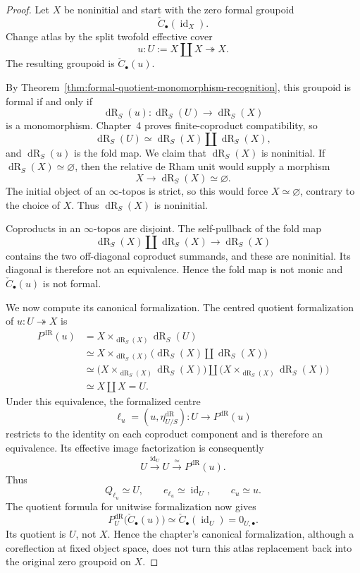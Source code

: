 \begin{proof}
Let $X$ be noninitial and start with the zero formal groupoid
\[
    \check C_\bullet(\operatorname{id}_X).
\]
Change atlas by the split twofold effective cover
\[
    u:
    U:=X\amalg X
    \twoheadrightarrow
    X.
\]
The resulting groupoid is $\check C_\bullet(u)$.

By Theorem~\ref{thm:formal-quotient-monomorphism-recognition}, this groupoid is
formal if and only if
\[
    \operatorname{dR}_S(u):
    \operatorname{dR}_S(U)\longrightarrow \operatorname{dR}_S(X)
\]
is a monomorphism.  Chapter~4 proves finite-coproduct
compatibility, so
\[
    \operatorname{dR}_S(U)
    \simeq
    \operatorname{dR}_S(X)\amalg \operatorname{dR}_S(X),
\]
and $\operatorname{dR}_S(u)$ is the fold map.  We claim that $\operatorname{dR}_S(X)$ is noninitial.  If
$\operatorname{dR}_S(X)\simeq\varnothing$, then the relative de Rham unit would supply a
morphism
\[
    X\longrightarrow \operatorname{dR}_S(X)\simeq\varnothing.
\]
The initial object of an $\infty$-topos is strict, so this would force
$X\simeq\varnothing$, contrary to the choice of $X$.  Thus $\operatorname{dR}_S(X)$ is
noninitial.

Coproducts in an $\infty$-topos are disjoint.  The self-pullback of the fold
map
\[
    \operatorname{dR}_S(X)\amalg \operatorname{dR}_S(X)
    \longrightarrow
    \operatorname{dR}_S(X)
\]
contains the two off-diagonal coproduct summands, and these are noninitial.
Its diagonal is therefore not an equivalence.  Hence the fold map is not
monic and $\check C_\bullet(u)$ is not formal.

We now compute its canonical formalization.  The centred quotient formalization
of $u:U\twoheadrightarrow X$ is
\[
\begin{aligned}
    P^{\mathrm{dR}}(u)
    &=
    X\times_{\operatorname{dR}_S(X)}\operatorname{dR}_S(U)\\
    &\simeq
    X\times_{\operatorname{dR}_S(X)}
    \bigl(\operatorname{dR}_S(X)\amalg \operatorname{dR}_S(X)\bigr)\\
    &\simeq
    \bigl(X\times_{\operatorname{dR}_S(X)}\operatorname{dR}_S(X)\bigr)
    \amalg
    \bigl(X\times_{\operatorname{dR}_S(X)}\operatorname{dR}_S(X)\bigr)\\
    &\simeq
    X\amalg X
    =
    U.
\end{aligned}
\]
Under this equivalence, the formalized centre
\[
    \ell_u=(u,\eta_{U/S}^{\mathrm{dR}}):U\longrightarrow P^{\mathrm{dR}}(u)
\]
restricts to the identity on each coproduct component and is therefore an
equivalence.  Its effective image factorization is consequently
\[
    U
    \xrightarrow{\operatorname{id}_U}
    U
    \xrightarrow{\simeq}
    P^{\mathrm{dR}}(u).
\]
Thus
\[
    Q_{\ell_u}\simeq U,
    \qquad
    e_{\ell_u}\simeq\operatorname{id}_U,
    \qquad
    c_u\simeq u.
\]
The quotient formula for unitwise formalization now gives
\[
    P_U^{\mathrm{dR}}\bigl(\check C_\bullet(u)\bigr)
    \simeq
    \check C_\bullet(\operatorname{id}_U)
    =
    0_{U,\bullet}.
\]
Its quotient is $U$, not $X$.  Hence the chapter's canonical formalization,
although a coreflection at fixed object space, does not turn this atlas
replacement back into the original zero groupoid on $X$.
\end{proof}

